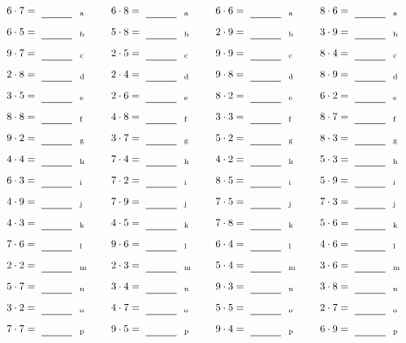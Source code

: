 \documentclass
[
  draft    = true,
  fontsize = 11pt,
  parskip  = half-
]
{scrartcl}
\begin{document}
\par\vfill\par
\begin{align*}
    \pline{6\cdot7}&=\rline{a}
  & \pline{6\cdot8}&=\rline{a}
  & \pline{6\cdot6}&=\rline{a}
  & \pline{8\cdot6}&=\rline{a} \\[1ex]
    \pline{6\cdot5}&=\rline{b}
  & \pline{5\cdot8}&=\rline{b}
  & \pline{2\cdot9}&=\rline{b}
  & \pline{3\cdot9}&=\rline{b} \\[1ex]
    \pline{9\cdot7}&=\rline{c}
  & \pline{2\cdot5}&=\rline{c}
  & \pline{9\cdot9}&=\rline{c}
  & \pline{8\cdot4}&=\rline{c} \\[1ex]
    \pline{2\cdot8}&=\rline{d}
  & \pline{2\cdot4}&=\rline{d}
  & \pline{9\cdot8}&=\rline{d}
  & \pline{8\cdot9}&=\rline{d} \\[1ex]
    \pline{3\cdot5}&=\rline{e}
  & \pline{2\cdot6}&=\rline{e}
  & \pline{8\cdot2}&=\rline{e}
  & \pline{6\cdot2}&=\rline{e} \\[1ex]
    \pline{8\cdot8}&=\rline{f}
  & \pline{4\cdot8}&=\rline{f}
  & \pline{3\cdot3}&=\rline{f}
  & \pline{8\cdot7}&=\rline{f} \\[1ex]
    \pline{9\cdot2}&=\rline{g}
  & \pline{3\cdot7}&=\rline{g}
  & \pline{5\cdot2}&=\rline{g}
  & \pline{8\cdot3}&=\rline{g} \\[1ex]
    \pline{4\cdot4}&=\rline{h}
  & \pline{7\cdot4}&=\rline{h}
  & \pline{4\cdot2}&=\rline{h}
  & \pline{5\cdot3}&=\rline{h} \\[1ex]
    \pline{6\cdot3}&=\rline{i}
  & \pline{7\cdot2}&=\rline{i}
  & \pline{8\cdot5}&=\rline{i}
  & \pline{5\cdot9}&=\rline{i} \\[1ex]
    \pline{4\cdot9}&=\rline{j}
  & \pline{7\cdot9}&=\rline{j}
  & \pline{7\cdot5}&=\rline{j}
  & \pline{7\cdot3}&=\rline{j} \\[1ex]
    \pline{4\cdot3}&=\rline{k}
  & \pline{4\cdot5}&=\rline{k}
  & \pline{7\cdot8}&=\rline{k}
  & \pline{5\cdot6}&=\rline{k} \\[1ex]
    \pline{7\cdot6}&=\rline{l}
  & \pline{9\cdot6}&=\rline{l}
  & \pline{6\cdot4}&=\rline{l}
  & \pline{4\cdot6}&=\rline{l} \\[1ex]
    \pline{2\cdot2}&=\rline{m}
  & \pline{2\cdot3}&=\rline{m}
  & \pline{5\cdot4}&=\rline{m}
  & \pline{3\cdot6}&=\rline{m} \\[1ex]
    \pline{5\cdot7}&=\rline{n}
  & \pline{3\cdot4}&=\rline{n}
  & \pline{9\cdot3}&=\rline{n}
  & \pline{3\cdot8}&=\rline{n} \\[1ex]
    \pline{3\cdot2}&=\rline{o}
  & \pline{4\cdot7}&=\rline{o}
  & \pline{5\cdot5}&=\rline{o}
  & \pline{2\cdot7}&=\rline{o} \\[1ex]
    \pline{7\cdot7}&=\rline{p}
  & \pline{9\cdot5}&=\rline{p}
  & \pline{9\cdot4}&=\rline{p}
  & \pline{6\cdot9}&=\rline{p}
\end{align*}
\end{document}
